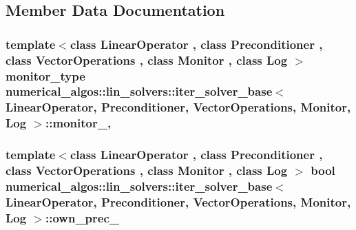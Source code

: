\subsection{Member Data Documentation}
\hypertarget{classnumerical__algos_1_1lin__solvers_1_1iter__solver__base_a8e3bc9cf6c62760a22ec74d2c671ab1d}{
\subsubsection[{monitor\-\_\-}]{\setlength{\rightskip}{0pt plus 5cm}template$<$class Linear\-Operator , class Preconditioner , class Vector\-Operations , class Monitor , class Log $>$ {\bf monitor\-\_\-type} {\bf numerical\-\_\-algos\-::lin\-\_\-solvers\-::iter\-\_\-solver\-\_\-base}$<$ Linear\-Operator, Preconditioner, Vector\-Operations, Monitor, Log $>$\-::monitor\-\_\-\hspace{0.3cm}{\ttfamily [mutable]}, {\ttfamily [protected]}}}\label{classnumerical__algos_1_1lin__solvers_1_1iter__solver__base_a8e3bc9cf6c62760a22ec74d2c671ab1d}
\hypertarget{classnumerical__algos_1_1lin__solvers_1_1iter__solver__base_a2632bf297a6c7e50eb7047bc3a1c744c}{
\subsubsection[{own\-\_\-prec\-\_\-}]{\setlength{\rightskip}{0pt plus 5cm}template$<$class Linear\-Operator , class Preconditioner , class Vector\-Operations , class Monitor , class Log $>$ bool {\bf numerical\-\_\-algos\-::lin\-\_\-solvers\-::iter\-\_\-solver\-\_\-base}$<$ Linear\-Operator, Preconditioner, Vector\-Operations, Monitor, Log $>$\-::own\-\_\-prec\-\_\-\hspace{0.3cm}{\ttfamily [protected]}}}\label{classnumerical__algos_1_1lin__solvers_1_1iter__solver__base_a2632bf297a6c7e50eb7047bc3a1c744c}
